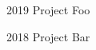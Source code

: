 
	
\begin{entrylist}
    \projentry%
		{2019}
		{Project Foo}
        {}
		{\lorem}
        
    \projentry%
		{2018}
		{Project Bar}
        {\skilltag{\LaTeX}}
		{\lorem}
\end{entrylist}


